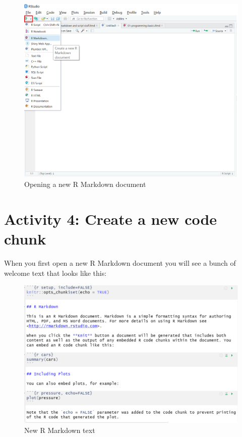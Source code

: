 \documentclass[
  oneside]{book}
\begin{document}
\begin{figure}

{\centering \includegraphics[width=1\linewidth]{images/new-markdown} 

}

\caption{Opening a new R Markdown document}\label{fig:img-new-markdown}
\end{figure}

\hypertarget{activity-4-create-a-new-code-chunk}{%
\section{Activity 4: Create a new code chunk}\label{activity-4-create-a-new-code-chunk}}

When you first open a new R Markdown document you will see a bunch of welcome text that looks like this:

\begin{figure}

{\centering \includegraphics[width=1\linewidth]{images/markdown-default} 

}

\caption{New R Markdown text}\label{fig:img-markdown-default}
\end{figure}
\end{document}
